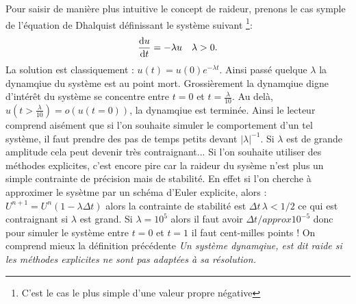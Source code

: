 \begin{exemple}
    Pour saisir de manière plus intuitive le concept de raideur, prenons le cas symple de l'équation de Dhalquist définissant le système suivant
    \footnote{C'est le cas le plus simple d'une valeur propre négative}:
    \begin{align}
        \frac{\text d u }{\text d t} = - \lambda u\quad \lambda > 0.
    \end{align}
    La solution est classiquement : $u(t) = u(0)e^{-\lambda t}$. Ainsi passé quelque $\lambda$ la dynamqiue du système est au point mort. 
    Grossièrement la dynamqiue digne d'intérêt du système se concentre entre $t=0$ et $t=\frac{\lambda}{10}$. Au delà, $u(t>\frac{\lambda}{10}) = o(u(t=0))$, la dynamqiue est terminée.
    Ainsi le lecteur comprend aisément que si l'on souhaite simuler le comportement d'un tel système, il faut prendre des pas de temps petits devant $\vert \lambda \vert^{-1}$.
    Si $\lambda$ est de grande amplitude cela peut devenir très contraignant... Si l'on souhaite utiliser des méthodes explicites, c'est encore pire car la raideur du sysème 
    n'est plus un simple contrainte de précision mais de stabilité. En effet si l'on cherche à approximer le sysètme par un schéma d'Euler explicite, alors : 
    $U^{n+1} = U^n (1 - \lambda \Delta t)$ alors la contrainte de stabilité est $\Delta t \, \lambda < 1/2$ ce qui est contraignant si $\lambda$ est grand. 
    Si $\lambda = 10^5$ alors il faut avoir $\Delta t /approx 10^{-5}$ donc pour simuler le système entre $t=0$ et $t=1$ il faut cent-milles points !
    On comprend mieux la définition précédente \textit{Un système dynamqiue, est dit raide si les méthodes explicites ne sont pas adaptées à sa résolution.}
\end{exemple}
